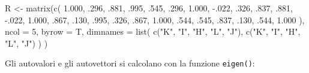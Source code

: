 \documentclass[
  11pt,
]{krantz}
\makeatletter
\newenvironment{Shaded}{\begin{snugshade}}{\end{snugshade}}
\newcommand{\AttributeTok}[1]{\textcolor[rgb]{0.61,0.61,0.61}{#1}}
\newcommand{\CommentTok}[1]{\textcolor[rgb]{0.37,0.37,0.37}{\textit{#1}}}
\newcommand{\DecValTok}[1]{\textcolor[rgb]{0.06,0.06,0.06}{#1}}
\newcommand{\FloatTok}[1]{\textcolor[rgb]{0.06,0.06,0.06}{#1}}
\newcommand{\FunctionTok}[1]{\textcolor[rgb]{0,0,0}{#1}}
\newcommand{\NormalTok}[1]{#1}
\newcommand{\OtherTok}[1]{\textcolor[rgb]{0.37,0.37,0.37}{#1}}
\newcommand{\SpecialCharTok}[1]{\textcolor[rgb]{0,0,0}{#1}}
\newcommand{\StringTok}[1]{\textcolor[rgb]{0.5,0.5,0.5}{#1}}
\newenvironment{kframe}{%
\medskip{}
\setlength{\fboxsep}{.8em}
 \def\at@end@of@kframe{}%
 \ifinner\ifhmode%
  \def\at@end@of@kframe{\end{minipage}}%
  \begin{minipage}{\columnwidth}%
 \fi\fi%
 \def\FrameCommand##1{\hskip\@totalleftmargin \hskip-\fboxsep
 \colorbox{shadecolor}{##1}\hskip-\fboxsep
     \hskip-\linewidth \hskip-\@totalleftmargin \hskip\columnwidth}%
 \MakeFramed {\advance\hsize-\width
   \@totalleftmargin\z@ \linewidth\hsize
   \@setminipage}}%
 {\par\unskip\endMakeFramed%
 \at@end@of@kframe}
\renewenvironment{Shaded}{\begin{kframe}}{\end{kframe}}
\theoremstyle{definition}
\theoremstyle{definition}
\theoremstyle{definition}
\theoremstyle{definition}
\theoremstyle{remark}
\makeatother
\begin{document}
\begin{Shaded}
\begin{Highlighting}[]
\NormalTok{R }\OtherTok{\textless{}{-}} \FunctionTok{matrix}\NormalTok{(}\FunctionTok{c}\NormalTok{(}
  \FloatTok{1.000}\NormalTok{, .}\DecValTok{296}\NormalTok{, .}\DecValTok{881}\NormalTok{, .}\DecValTok{995}\NormalTok{, .}\DecValTok{545}\NormalTok{,}
\NormalTok{  .}\DecValTok{296}\NormalTok{, }\FloatTok{1.000}\NormalTok{, }\SpecialCharTok{{-}}\NormalTok{.}\DecValTok{022}\NormalTok{, .}\DecValTok{326}\NormalTok{, .}\DecValTok{837}\NormalTok{,}
\NormalTok{  .}\DecValTok{881}\NormalTok{, }\SpecialCharTok{{-}}\NormalTok{.}\DecValTok{022}\NormalTok{, }\FloatTok{1.000}\NormalTok{, .}\DecValTok{867}\NormalTok{, .}\DecValTok{130}\NormalTok{,}
\NormalTok{  .}\DecValTok{995}\NormalTok{, .}\DecValTok{326}\NormalTok{, .}\DecValTok{867}\NormalTok{, }\FloatTok{1.000}\NormalTok{, .}\DecValTok{544}\NormalTok{,}
\NormalTok{  .}\DecValTok{545}\NormalTok{, .}\DecValTok{837}\NormalTok{, .}\DecValTok{130}\NormalTok{, .}\DecValTok{544}\NormalTok{, }\FloatTok{1.000}
\NormalTok{),}
\AttributeTok{ncol =} \DecValTok{5}\NormalTok{, }\AttributeTok{byrow =}\NormalTok{ T, }\AttributeTok{dimnames =} \FunctionTok{list}\NormalTok{(}
  \FunctionTok{c}\NormalTok{(}\StringTok{"K"}\NormalTok{, }\StringTok{"I"}\NormalTok{, }\StringTok{"H"}\NormalTok{, }\StringTok{"L"}\NormalTok{, }\StringTok{"J"}\NormalTok{),}
  \FunctionTok{c}\NormalTok{(}\StringTok{"K"}\NormalTok{, }\StringTok{"I"}\NormalTok{, }\StringTok{"H"}\NormalTok{, }\StringTok{"L"}\NormalTok{, }\StringTok{"J"}\NormalTok{)}
\NormalTok{)}
\NormalTok{)}
\end{Highlighting}
\end{Shaded}

Gli autovalori e gli autovettori si calcolano con la funzione \texttt{eigen()}:

\begin{Shaded}
\end{Shaded}
\end{document}
